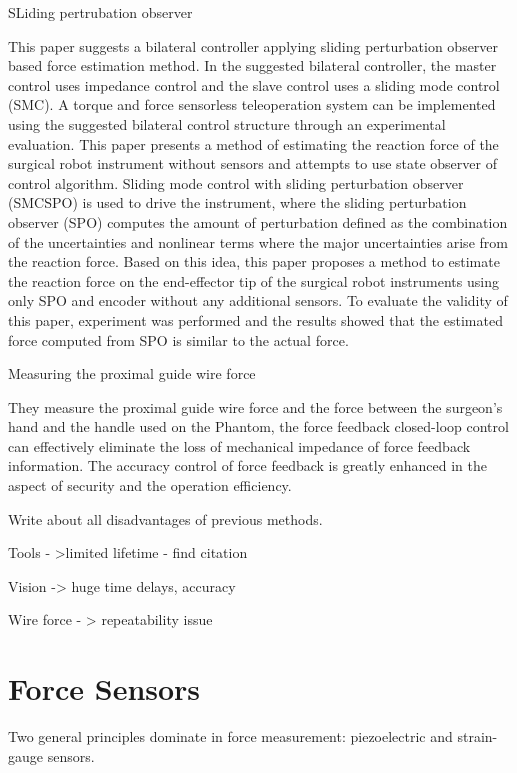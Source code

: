 SLiding pertrubation observer

This paper suggests a bilateral controller applying sliding perturbation 
observer based force estimation method. In the suggested bilateral controller, 
the master control uses impedance control and the slave control uses a sliding 
mode control (SMC). A torque and force sensorless teleoperation system can be 
implemented using the suggested bilateral control structure through an 
experimental evaluation. This paper presents a method of estimating the 
reaction force of the surgical robot instrument without sensors and attempts 
to use state observer of control algorithm. Sliding mode control with sliding 
perturbation observer (SMCSPO) is used to drive the instrument, where the 
sliding perturbation observer (SPO) computes the amount of perturbation 
defined as the combination of the uncertainties and nonlinear terms where 
the major uncertainties arise from the reaction force. Based on this idea, 
this paper proposes a method to estimate the reaction force on the end-effector 
tip of the surgical robot instruments using only SPO and encoder without 
any additional sensors. To evaluate the validity of this paper, experiment 
was performed and the results showed that the estimated force computed from 
SPO is similar to the actual force.

Measuring the proximal guide wire force \cite{yoon_design_2015}

They measure the proximal guide wire force and the force between the surgeon's 
hand and the handle used on the Phantom, the force feedback closed-loop control 
can effectively eliminate the loss of mechanical impedance of force feedback 
information. The accuracy control of force feedback is greatly enhanced in the 
aspect of security and the operation efficiency.

Write about all disadvantages of previous methods.

Tools - >limited lifetime - find citation

Vision -> huge time delays, accuracy

Wire force - > repeatability issue


\section{Force Sensors}
\label{sec:ForceSensors}

Two general principles dominate in force measurement: piezoelectric and strain-gauge sensors. \cite{SGandP1}

